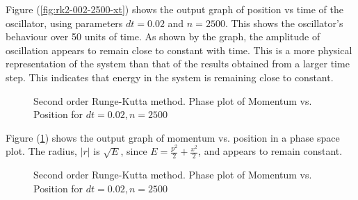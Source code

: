 \documentclass[pdf,color]{UoBnote}
\begin{document}
				Figure (\ref{fig:rk2-002-2500-xt}) shows the output graph of position vs time of the oscillator, using parameters $dt = 0.02$ and $n = 2500$. This shows the oscillator's behaviour over 50 units of time. As shown by the graph, the amplitude of oscillation appears to remain close to constant with time. This is a more physical representation of the system than that of the results obtained from a larger time step. This indicates that energy in the system is remaining close to constant.	
				
				\begin{figure}[H]
					\centering
					\caption{Second order Runge-Kutta method. Phase plot of Momentum vs. Position for $dt = 0.02, n = 2500$}
					\label{fig:rk2-002-2500-phase}
				\end{figure}
				
				Figure (\ref{fig:rk2-002-2500-phase}) shows the output graph of momentum vs. position in a phase space plot. The radius, $\vert r \vert$ is $\sqrt{E}$, since $E = \frac{p^2}{2} + \frac{x^2}{2}$, and appears to remain constant.
				
\begin{figure}[H]
					\centering
					\caption{Second order Runge-Kutta method. Phase plot of Momentum vs. Position for $dt = 0.02, n = 2500$}
					\label{fig:rk2-002-2500-energy}
				\end{figure}
	
\end{document}
